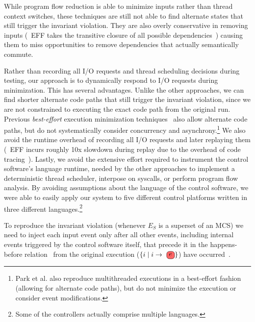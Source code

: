 While program flow reduction is able to minimize inputs rather than thread context switches,
these techniques are still not able to find alternate states that still
trigger the invariant violation. They are also overly conservative in
removing inputs (\eg~EFF takes the transitive closure of all possible
dependencies~\cite{Lee:2011:TGR:1993498.1993528}) causing them to miss opportunities to
remove dependencies that actually semantically commute.

 Rather than recording all
I/O requests and thread scheduling decisions during testing, our approach is
to dynamically respond to I/O requests during minimization. This has several advantages. Unlike
the other approaches, we can find shorter alternate code paths that still
trigger the invariant violation, since we are not constrained to executing the exact code path
from the original run. Previous {\em best-effort} execution minimization
techniques~\cite{clause2007technique,tucek2007triage} also allow alternate
code paths, but do not systematically
consider concurrency and asynchrony.\footnote{Park et al.\cite{park2009pres}
also reproduce multithreaded executions in a best-effort fashion (allowing for
alternate code paths), but do not minimize the execution or consider event
modifications.}
We also avoid the runtime overhead of recording all I/O
requests and later replaying them (\eg~EFF incurs roughly 10x slowdown during
replay due to the overhead of code tracing~\cite{Lee:2011:TGR:1993498.1993528}). Lastly,
we avoid the extensive effort required to instrument the control software's language runtime,
needed by the other approaches to implement a deterministic thread scheduler, interpose on syscalls,
or perform program flow analysis. By avoiding assumptions about the language of the control software,
we were able to easily apply our system to five different control platforms
written in three different languages.\footnote{Some of the controllers
actually comprise multiple languages.} %



 To reproduce the invariant violation (whenever $E_S$ is a superset of an MCS)
we need to inject each input event \external{} only after all other
events, including internal events triggered by the control software itself,
that precede it in the
happens-before relation~\cite{Lamport:1978:TCO:359545.359563} from the
original execution ($\{i \mid i \rightarrow \text{\external{}}\}$) have
occurred~\cite{tel2000introduction}.

